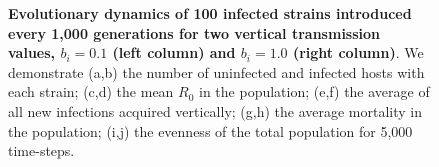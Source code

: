 \begin{figure}[hbt!]
    \medskip
    \hfil
\caption{\textbf{Evolutionary dynamics of 100 infected strains introduced every 1,000 generations for two vertical transmission values, $b_i = 0.1$ (left column) and $b_i = 1.0$ (right column)}. We demonstrate (a,b) the number of uninfected and infected hosts with each strain; (c,d) the mean $R_0$ in the population; (e,f) the average of all new infections acquired vertically; (g,h) the average mortality in the population; (i,j) the evenness of the total population for 5,000 time-steps.
}
    \label{fig:SF1}
\end{figure}


